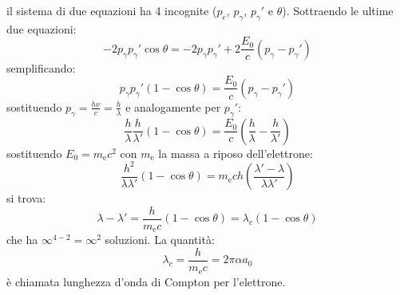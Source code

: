 il sistema di due equazioni ha 4 incognite ($p_e$, $p_\gamma$, $p_\gamma'$ e $\theta$). Sottraendo le ultime due equazioni:
\begin{equation}
-2p_\gamma p_\gamma'\cos\theta=-2p_\gamma p_\gamma'+2\frac{E_0}{c}(p_\gamma-p_\gamma')
\end{equation}
semplificando:
\begin{equation}
p_\gamma p_\gamma'(1-\cos\theta)=\frac{E_0}{c}(p_\gamma-p_\gamma')
\end{equation}
sostituendo $p_\gamma=\frac{h\nu}{c}=\frac{h}{\lambda}$ e analogamente per $p_\gamma'$:
\begin{equation}
\frac{h}{\lambda}\frac{h}{\lambda'}(1-\cos\theta)=\frac{E_0}{c}\left(\frac{h}{\lambda}-\frac{h}{\lambda'}\right)
\end{equation}
sostituendo $E_0=m_\mathrm{e}c^2$ con $m_\mathrm{e}$ la massa a riposo dell'elettrone:
\begin{equation}
\frac{h^2}{\lambda\lambda'}(1-\cos\theta)=m_\mathrm{e}ch\left(\frac{\lambda'-\lambda}{\lambda\lambda'}\right)
\end{equation}
si trova:
\begin{equation}
\lambda-\lambda'=\frac{h}{m_\mathrm{e}c}\left(1-\cos\theta\right)=\lambda_c\left(1-\cos\theta\right)
\end{equation}
che ha $\infty^{4-2}=\infty^2$ soluzioni. La quantità:
\begin{equation}
\lambda_c=\frac{h}{m_\mathrm{e}c}=2\pi\alpha a_0
\end{equation}
è chiamata lunghezza d'onda di Compton per l'elettrone.
